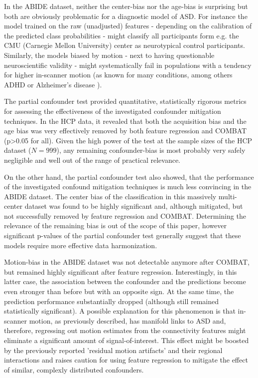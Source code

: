 \documentclass{article}
\begin{document}
In the ABIDE dataset, neither the center-bias nor the age-bias is surprising but both are obviously problematic for a diagnostic model of ASD. For instance the model trained on the raw (unadjusted) features - depending on the calibration of the predicted class probabilities - might classify all participants form e.g. the CMU (Carnegie Mellon University) center as neurotypical control participants. Similarly, the models biased by motion - next to having questionable neuroscientific validity - might systematically fail in populations with a tendency for higher in-scanner motion (as known for many conditions, among others ADHD\citep{eloyan2012automated} or Alzheimer's disease \citep{rao2017predictive}).
 
 The partial confounder test provided quantitative, statistically rigorous metrics for assessing the effectiveness of the investigated confounder mitigation techniques. In the HCP data, it revealed that both the acquisition bias and the age bias was very effectively removed by both feature regression and COMBAT (p>0.05 for all). Given the high power of the test at the sample sizes of the HCP dataset ($N=999$), any remaining confounder-bias is most probably very safely negligible and well out of the range of practical relevance.
 
On the other hand, the partial confounder test also showed, that the performance of the investigated confound mitigation techniques is much less convincing in the ABIDE dataset. The center bias of the classification in this massively multi-center dataset was found to be highly significant and, although mitigated, but not successfully removed by feature regression and COMBAT. Determining the relevance of the remaining bias is out of the scope of this paper, however significant p-values of the partial confounder test generally suggest that these models require more effective data harmonization.

Motion-bias in the ABIDE dataset was not detectable anymore after COMBAT, but remained highly significant after feature regression.
Interestingly, in this latter case, the association between the confounder and the predictions become even stronger than before but with an opposite sign. At the same time, the prediction performance substantially dropped (although still remained statistically significant). 
A possible explanation for this phenomenon is that in-scanner motion, as previously described\citep{fournier2010motor, anzulewicz2016toward}, has manifold links to ASD and, therefore, regressing out motion estimates from the connectivity features might eliminate a significant amount of signal-of-interest. This effect might be boosted by the previously reported 'residual motion artifacts' and their regional interactions\citep{spisak2014voxel} and raises caution for using feature regression to mitigate the effect of similar, complexly distributed confounders.
 
\end{document}
